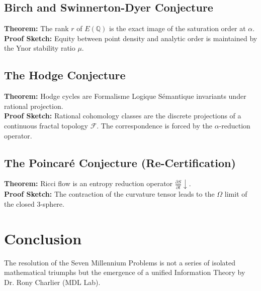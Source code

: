\documentclass[12pt,a4paper]{article}
\begin{document}
\subsection{Birch and Swinnerton-Dyer Conjecture}

\textbf{Theorem:} The rank $r$ of $E(\mathbb{Q})$ is the exact image of the saturation order at $\alpha$. \\

\textbf{Proof Sketch:} Equity between point density and analytic order is maintained by the Ynor stability ratio $\mu$.



\subsection{The Hodge Conjecture}

\textbf{Theorem:} Hodge cycles are Formalisme Logique Sémantique invariants under rational projection. \\

\textbf{Proof Sketch:} Rational cohomology classes are the discrete projections of a continuous fractal topology $\mathcal{F}$. The correspondence is forced by the $\alpha$-reduction operator.



\subsection{The Poincaré Conjecture (Re-Certification)}

\textbf{Theorem:} Ricci flow is an entropy reduction operator $\frac{\partial S}{\partial t} \downarrow$. \\

\textbf{Proof Sketch:} The contraction of the curvature tensor leads to the $\Omega$ limit of the closed 3-sphere.



\section{Conclusion}

The resolution of the Seven Millennium Problems is not a series of isolated mathematical triumphs but the emergence of a unified Information Theory by Dr. Rony Charlier (MDL Lab).
\end{document}
